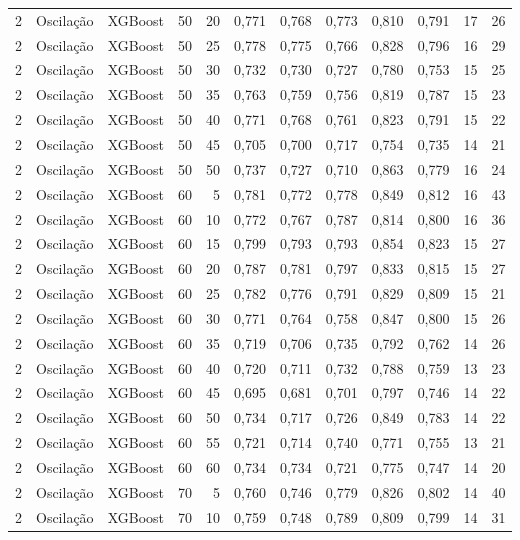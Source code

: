 \begin{longtable}{@{}rllrrrrrrrrr@{}}
2 & Oscilação & XGBoost & 50 & 20 & 0,771 & 0,768 & 0,773 & 0,810 & 0,791 & 17 & 26 \\
2 & Oscilação & XGBoost & 50 & 25 & 0,778 & 0,775 & 0,766 & 0,828 & 0,796 & 16 & 29 \\
2 & Oscilação & XGBoost & 50 & 30 & 0,732 & 0,730 & 0,727 & 0,780 & 0,753 & 15 & 25 \\
2 & Oscilação & XGBoost & 50 & 35 & 0,763 & 0,759 & 0,756 & 0,819 & 0,787 & 15 & 23 \\
2 & Oscilação & XGBoost & 50 & 40 & 0,771 & 0,768 & 0,761 & 0,823 & 0,791 & 15 & 22 \\
2 & Oscilação & XGBoost & 50 & 45 & 0,705 & 0,700 & 0,717 & 0,754 & 0,735 & 14 & 21 \\
2 & Oscilação & XGBoost & 50 & 50 & 0,737 & 0,727 & 0,710 & 0,863 & 0,779 & 16 & 24 \\
2 & Oscilação & XGBoost & 60 & 5 & 0,781 & 0,772 & 0,778 & 0,849 & 0,812 & 16 & 43 \\
2 & Oscilação & XGBoost & 60 & 10 & 0,772 & 0,767 & 0,787 & 0,814 & 0,800 & 16 & 36 \\
2 & Oscilação & XGBoost & 60 & 15 & 0,799 & 0,793 & 0,793 & 0,854 & 0,823 & 15 & 27 \\
2 & Oscilação & XGBoost & 60 & 20 & 0,787 & 0,781 & 0,797 & 0,833 & 0,815 & 15 & 27 \\
2 & Oscilação & XGBoost & 60 & 25 & 0,782 & 0,776 & 0,791 & 0,829 & 0,809 & 15 & 21 \\
2 & Oscilação & XGBoost & 60 & 30 & 0,771 & 0,764 & 0,758 & 0,847 & 0,800 & 15 & 26 \\
2 & Oscilação & XGBoost & 60 & 35 & 0,719 & 0,706 & 0,735 & 0,792 & 0,762 & 14 & 26 \\
2 & Oscilação & XGBoost & 60 & 40 & 0,720 & 0,711 & 0,732 & 0,788 & 0,759 & 13 & 23 \\
2 & Oscilação & XGBoost & 60 & 45 & 0,695 & 0,681 & 0,701 & 0,797 & 0,746 & 14 & 22 \\
2 & Oscilação & XGBoost & 60 & 50 & 0,734 & 0,717 & 0,726 & 0,849 & 0,783 & 14 & 22 \\
2 & Oscilação & XGBoost & 60 & 55 & 0,721 & 0,714 & 0,740 & 0,771 & 0,755 & 13 & 21 \\
2 & Oscilação & XGBoost & 60 & 60 & 0,734 & 0,734 & 0,721 & 0,775 & 0,747 & 14 & 20 \\
2 & Oscilação & XGBoost & 70 & 5 & 0,760 & 0,746 & 0,779 & 0,826 & 0,802 & 14 & 40 \\
2 & Oscilação & XGBoost & 70 & 10 & 0,759 & 0,748 & 0,789 & 0,809 & 0,799 & 14 & 31 \\

\end{longtable}
